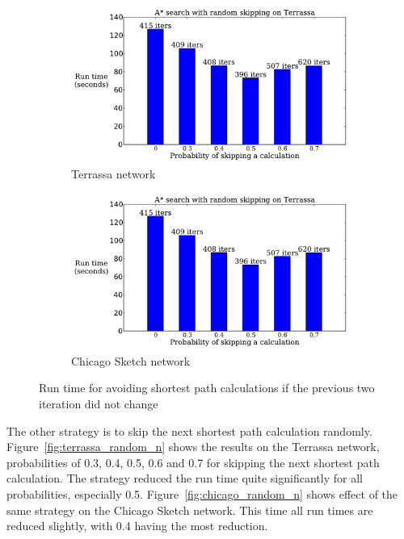 \begin{figure}[H]
    \centering
    \begin{subfigure}{.5\textwidth}
        \centering
        \includegraphics[page=3,width=\textwidth]{img/random_time}
        \caption{Terrassa network}
        \label{fig:terrassa_skip_n}
    \end{subfigure}%
    \begin{subfigure}{.5\textwidth}
        \centering
        \includegraphics[page=4,width=\textwidth]{img/random_time}
        \caption{Chicago Sketch network}
        \label{fig:chicago_skip_n}
    \end{subfigure}
    \caption{Run time for avoiding shortest path calculations if the previous two iteration did not change}
    \label{fig:skip_n}
\end{figure}

The other strategy is to skip the next shortest path calculation randomly.
Figure~\ref{fig:terrassa_random_n} shows the results on the Terrassa network, probabilities of 0.3, 0.4, 0.5, 0.6 and 0.7 for skipping the next shortest path calculation.
The strategy reduced the run time quite significantly for all probabilities,
especially 0.5.
Figure~\ref{fig:chicago_random_n} shows effect of the same strategy on the Chicago Sketch network.
This time all run times are reduced slightly, with 0.4 having the most reduction.

